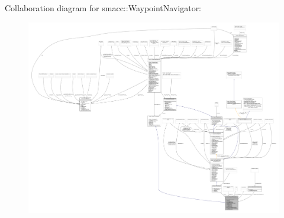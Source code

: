 Collaboration diagram for smacc\+:\+:Waypoint\+Navigator\+:
\nopagebreak
\begin{figure}[H]
\begin{center}
\leavevmode
\includegraphics[width=350pt]{classsmacc_1_1WaypointNavigator__coll__graph}
\end{center}
\end{figure}
